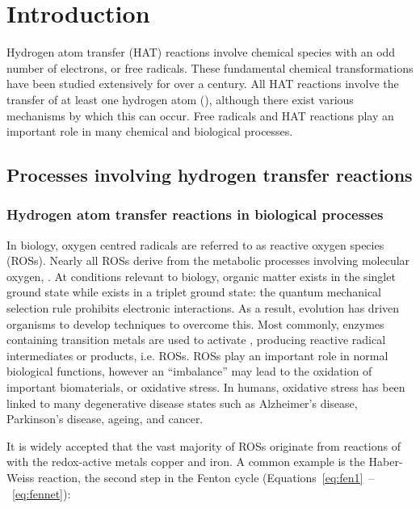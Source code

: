 
\chapter{Introduction}

Hydrogen atom transfer (HAT) reactions involve chemical species with an odd
number of electrons, or free radicals. These fundamental chemical
transformations have been studied extensively for over a
century.\cite{Kochi1973,Parsons2000} All HAT reactions involve the transfer of
at least one hydrogen atom (), although there exist various mechanisms
by which this can occur. Free radicals and HAT reactions play an important role
in many chemical and biological processes.\cite{Halliwell2015}

\section{Processes involving hydrogen transfer reactions}

\subsection{Hydrogen atom transfer reactions in biological processes}

In biology, oxygen centred radicals are referred to as reactive oxygen species
(ROSs). Nearly all ROSs derive from the metabolic processes involving molecular
oxygen, .\cite{Barnham2004} At conditions relevant to biology, organic
matter exists in the singlet ground state while  exists in a triplet
ground state: the quantum mechanical selection rule prohibits electronic
interactions. As a result, evolution has driven organisms to develop techniques
to overcome this. Most commonly, enzymes containing transition metals are used
to activate , producing reactive radical intermediates or products,
i.e. ROSs. ROSs play an important role in normal biological functions, however
an ``imbalance'' may lead to the oxidation of important biomaterials, or
oxidative stress.\cite{Halliwell2015} In humans, oxidative stress has been
linked to many degenerative disease states such as Alzheimer's
disease,\cite{Barnham2004,Valko2007} Parkinson's disease,\cite{Hwang2013}
ageing, and cancer.\cite{Halliwell2007}

It is widely accepted that the vast majority of ROSs originate from reactions of
 with the redox-active metals copper and iron.\cite{Halliwell2015} A
common example is the Haber-Weiss reaction, the second step in the Fenton cycle
(Equations~\ref{eq:fen1}~--~\ref{eq:fennet}):

